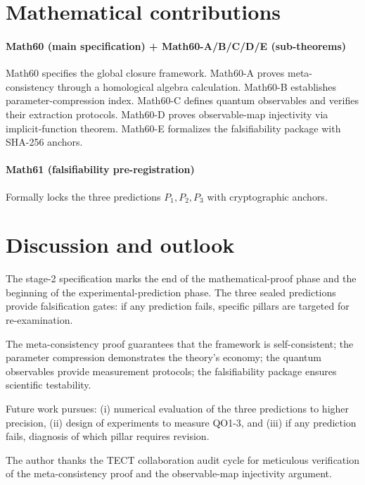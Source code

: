 \section{Mathematical contributions}

\paragraph{Math60 (main specification) + Math60-A/B/C/D/E (sub-theorems)}
Math60 specifies the global closure framework. Math60-A proves meta-consistency through
a homological algebra calculation. Math60-B establishes parameter-compression index.
Math60-C defines quantum observables and verifies their extraction protocols.
Math60-D proves observable-map injectivity via implicit-function theorem.
Math60-E formalizes the falsifiability package with SHA-256 anchors.
\cite{Math60, Math60AddA, Math60AddB, Math60AddC, Math60AddD, Math60AddE}

\paragraph{Math61 (falsifiability pre-registration)}
Formally locks the three predictions $P_1, P_2, P_3$ with cryptographic anchors.
\cite{Math61}

\section{Discussion and outlook}
The stage-2 specification marks the end of the mathematical-proof phase and the beginning
of the experimental-prediction phase. The three sealed predictions provide falsification
gates: if any prediction fails, specific pillars are targeted for re-examination.

The meta-consistency proof guarantees that the framework is self-consistent; the parameter
compression demonstrates the theory's economy; the quantum observables provide measurement
protocols; the falsifiability package ensures scientific testability.

Future work pursues: (i) numerical evaluation of the three predictions to higher precision,
(ii) design of experiments to measure QO1-3, and (iii) if any prediction fails, diagnosis
of which pillar requires revision.

\begin{acknowledgments}
The author thanks the TECT collaboration audit cycle for meticulous
verification of the meta-consistency proof and the observable-map
injectivity argument.
\end{acknowledgments}





